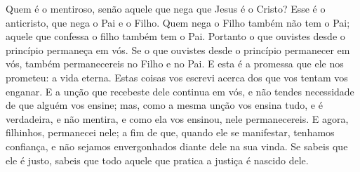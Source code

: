 {  Quem é o mentiroso, senão aquele que nega que Jesus é o Cristo? Esse é o anticristo, que nega o Pai e o Filho.
  Quem nega o Filho também não tem o Pai; aquele que confessa o filho também tem o Pai.
  Portanto o que ouvistes desde o princípio permaneça em vós. Se o que ouvistes desde o princípio permanecer em vós, também permanecereis no Filho e no Pai.
  E esta é a promessa que ele nos prometeu: a vida eterna.
  Estas coisas vos escrevi acerca dos que vos tentam vos enganar.
  E a unção que recebeste dele continua em vós, e não tendes necessidade de que alguém vos ensine; mas, como a mesma unção vos ensina tudo, e é verdadeira, e não mentira, e como ela vos ensinou,
{} nele permanecereis.
  E agora, filhinhos, permanecei nele; a fim de que, quando ele se manifestar, tenhamos confiança, e não sejamos envergonhados diante dele na sua vinda.
  Se sabeis que ele é justo, sabeis que todo aquele que pratica a justiça é nascido dele.
\par }

